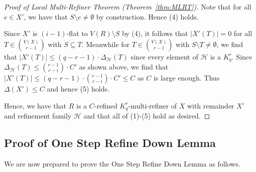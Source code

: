 \documentclass[11pt]{article}
\newcounter{i}
\theoremstyle{plain}
\theoremstyle{plain} %
\theoremstyle{definition}
\begin{document}
\begin{proof}[Proof of Local Multi-Refiner Theorem (Theorem~\ref{thm:MLRT})]
Note that for all $e\in X'$, we have that $S\setminus e\ne \emptyset$ by construction. Hence (4) holds. 

Since $X'$ is $(i-1)$-flat to $V(R)\setminus S$ by (4), it follows that $|X'(T)|=0$ for all $T\in \binom{V(X)}{r-1}$ with $S\subseteq T$. Meanwhile for $T\in \binom{V(X)}{r-1}$ with $S\setminus T\ne \emptyset$, we find that $|X'(T)| \le (q-r-1)\cdot \Delta_{\mathcal{H}}(T)$ since every element of $\mathcal{H}$ is a $K_q^r$. Since $\Delta_{\mathcal{H}}(T)\le \binom{r-1}{r-i}\cdot C'$ as shown above, we find that $|X'(T)| \le (q-r-1)\cdot \binom{r-1}{r-i}\cdot C' \le C$ as $C$ is large enough. Thus $\Delta(X')\le C$ and hence (5) holds.

Hence, we have that $R$ is a $C$-refined $K_q^r$-multi-refiner of $X$ with remainder $X'$ and refinement family $\mathcal{H}$ and that all of (1)-(5) hold as desired.




\end{proof}

\subsection{Proof of One Step Refine Down Lemma}

We are now prepared to prove the One Step Refine Down Lemma as follows.
\end{document}
